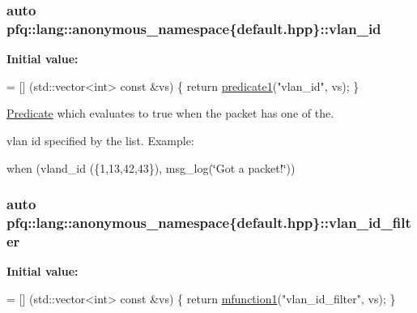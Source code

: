 \hypertarget{namespacepfq_1_1lang_1_1anonymous__namespace_02default_8hpp_03_ad2a631020f34bf10335ebb0e79f03920}{
\subsubsection[{vlan\+\_\+id}]{\setlength{\rightskip}{0pt plus 5cm}auto pfq\+::lang\+::anonymous\+\_\+namespace\{default.\+hpp\}\+::vlan\+\_\+id}}\label{namespacepfq_1_1lang_1_1anonymous__namespace_02default_8hpp_03_ad2a631020f34bf10335ebb0e79f03920}
{\bfseries Initial value\+:}
\begin{DoxyCode}
= [] (std::vector<int> \textcolor{keyword}{const} &vs) \{
                                    \textcolor{keywordflow}{return} \hyperlink{namespacepfq_1_1lang_a3e018f096545ca95a68e67027c8e3144}{predicate1}(\textcolor{stringliteral}{"vlan\_id"}, vs);
                                \}
\end{DoxyCode}


\hyperlink{structpfq_1_1lang_1_1Predicate}{Predicate} which evaluates to {\ttfamily true} when the packet has one of the. 

vlan id specified by the list. Example\+:

when (vland\+\_\+id (\{1,13,42,43\}), msg\+\_\+log(\char`\"{}\+Got a packet!\char`\"{})) \hypertarget{namespacepfq_1_1lang_1_1anonymous__namespace_02default_8hpp_03_ab843ad210e98a7c8a4218efaf60f8c01}{
\subsubsection[{vlan\+\_\+id\+\_\+filter}]{\setlength{\rightskip}{0pt plus 5cm}auto pfq\+::lang\+::anonymous\+\_\+namespace\{default.\+hpp\}\+::vlan\+\_\+id\+\_\+filter}}\label{namespacepfq_1_1lang_1_1anonymous__namespace_02default_8hpp_03_ab843ad210e98a7c8a4218efaf60f8c01}
{\bfseries Initial value\+:}
\begin{DoxyCode}
= [] (std::vector<int> \textcolor{keyword}{const} &vs) \{
                                    \textcolor{keywordflow}{return} \hyperlink{namespacepfq_1_1lang_a68d775c68562fbd0ab9ef213f2519499}{mfunction1}(\textcolor{stringliteral}{"vlan\_id\_filter"}, vs);
                              \}
\end{DoxyCode}


